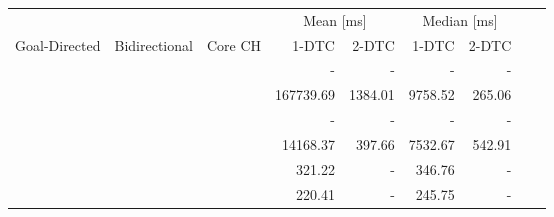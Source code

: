 \begin{tabular}{cccrrrrrr}
	\toprule
	              &               &         & \multicolumn{2}{c}{Mean [\si{\milli\second}]} & \multicolumn{2}{c}{Median [\si{\milli\second}]}                 \\
	Goal-Directed & Bidirectional & Core CH & 1-DTC                                       & 2-DTC                                         & 1-DTC & 2-DTC \\
	\midrule
	\xmark        & \xmark        & \xmark  & -                                           & -                                             & -     & -     \\
	\cmark        & \xmark        & \xmark  & 167739.69                                           & 1384.01                                             & 9758.52     & 265.06     \\
	\xmark        & \cmark        & \xmark  & -                                           & -                                             & -     & -     \\
	\cmark        & \cmark        & \xmark  & 14168.37                                           & 397.66                                             & 7532.67     & 542.91     \\
	\xmark        & \cmark        & \cmark  & 321.22                                           & -                                             & 346.76     & -     \\
	\cmark        & \cmark        & \cmark  & 220.41                                           & -                                             & 245.75     & -     \\
	\bottomrule
\end{tabular}